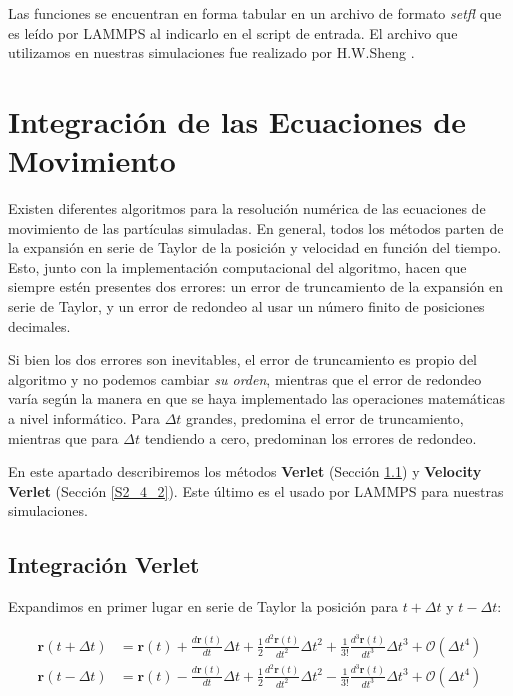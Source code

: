 Las funciones se encuentran en forma tabular en un archivo de formato \textit{setfl} \citep{setfl} que es leído por LAMMPS al indicarlo en el script de entrada. El archivo que utilizamos en nuestras simulaciones fue realizado por H.W.Sheng \citep{cheng09}.

\section{Integración de las Ecuaciones de Movimiento}
\label{S2_4}

Existen diferentes algoritmos para la resolución numérica de las ecuaciones de movimiento de las partículas simuladas. En general, todos los métodos parten de la expansión en serie de Taylor de la posición y velocidad en función del tiempo. Esto, junto con la implementación computacional del algoritmo, hacen que siempre estén presentes dos errores: un error de truncamiento de la expansión en serie de Taylor, y un error de redondeo al usar un número finito de posiciones decimales.

Si bien los dos errores son inevitables, el error de truncamiento es propio del algoritmo y no podemos cambiar \textit{su orden}, mientras que el error de redondeo varía según la manera en que se haya implementado las operaciones matemáticas a nivel informático. Para $\Delta{}t$ grandes, predomina el error de truncamiento, mientras que para $\Delta{}t$ tendiendo a cero, predominan los errores de redondeo.

En este apartado describiremos los métodos \textbf{Verlet} (Sección \ref{S2_4_1}) y \textbf{Velocity Verlet} (Sección \ref{S2_4_2}). Este último es el usado por LAMMPS para nuestras simulaciones.

\subsection{Integración Verlet}
\label{S2_4_1}

Expandimos en primer lugar en serie de Taylor la posición para $t+\Delta{}t$ y $t-\Delta{}t$:

\begin{align}
\mathbf{r}(t+\Delta{}t) & = \mathbf{r}(t)+\frac{d\mathbf{r}(t)}{dt} \Delta{}t + \frac{1}{2} \frac{d^{2}\mathbf{r}(t)}{dt^{2}} \Delta{}t^{2} + \frac{1}{3!} \frac{d^{3}\mathbf{r}(t)}{dt^{3}} \Delta{}t^{3} + \mathcal{O}(\Delta{}t^{4})
\label{C2:eq:VerletTaylor1} \\
\mathbf{r}(t-\Delta{}t) & = \mathbf{r}(t)-\frac{d\mathbf{r}(t)}{dt} \Delta{}t + \frac{1}{2} \frac{d^{2}\mathbf{r}(t)}{dt^{2}} \Delta{}t^{2} - \frac{1}{3!} \frac{d^{3}\mathbf{r}(t)}{dt^{3}} \Delta{}t^{3} + \mathcal{O}(\Delta{}t^{4})
\label{C2:eq:VerletTaylor2}
\end{align}

